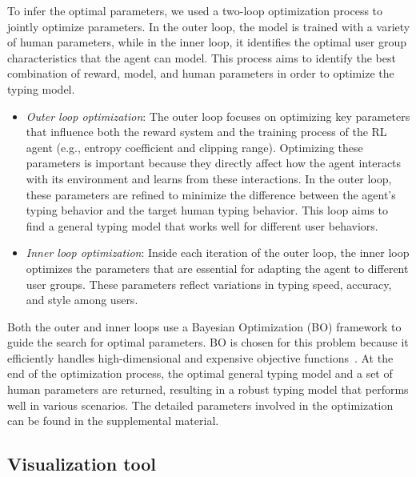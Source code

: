 To infer the optimal parameters, we used a two-loop optimization process to jointly optimize parameters. In the outer loop, the model is trained with a variety of human parameters, while in the inner loop, it identifies the optimal user group characteristics that the agent can model. This process aims to identify the best combination of reward, model, and human parameters in order to optimize the typing model.

\begin{itemize}
    \item \textit{Outer loop optimization}: The outer loop focuses on optimizing key parameters that influence both the reward system and the training process of the RL agent (e.g., entropy coefficient and clipping range). Optimizing these parameters is important because they directly affect how the agent interacts with its environment and learns from these interactions. In the outer loop, these parameters are refined to minimize the difference between the agent's typing behavior and the target human typing behavior. This loop aims to find a general typing model that works well for different user behaviors.
    \item \textit{Inner loop optimization}:  Inside each iteration of the outer loop, the inner loop optimizes the parameters that are essential for adapting the agent to different user groups. These parameters reflect variations in typing speed, accuracy, and style among users.
\end{itemize}

Both the outer and inner loops use a Bayesian Optimization (BO) framework to guide the search for optimal parameters. BO is chosen for this problem because it efficiently handles high-dimensional and expensive objective functions~\cite{gel_bayesian_2018}. At the end of the optimization process, the optimal general typing model and a set of human parameters are returned, resulting in a robust typing model that performs well in various scenarios. The detailed parameters involved in the optimization can be found in the supplemental material.

\subsection{Visualization tool} 
\label{sec:exploration}

